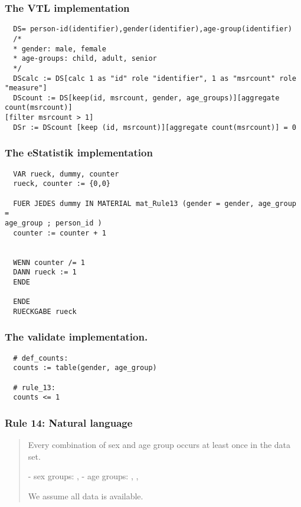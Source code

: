 \subsubsection*{The VTL implementation}
\begin{verbatim}
  DS= person-id(identifier),gender(identifier),age-group(identifier)
  /*
  * gender: male, female
  * age-groups: child, adult, senior
  */
  DScalc := DS[calc 1 as "id" role "identifier", 1 as "msrcount" role "measure"]
  DScount := DS[keep(id, msrcount, gender, age_groups)][aggregate count(msrcount)]
[filter msrcount > 1]
  DSr := DScount [keep (id, msrcount)][aggregate count(msrcount)] = 0
\end{verbatim}
\subsubsection*{The eStatistik implementation}
\begin{verbatim}
  VAR rueck, dummy, counter
  rueck, counter := {0,0}

  FUER JEDES dummy IN MATERIAL mat_Rule13 (gender = gender, age_group =
age_group ; person_id )
  counter := counter + 1


  WENN counter /= 1
  DANN rueck := 1
  ENDE

  ENDE
  RUECKGABE rueck
\end{verbatim}
\subsubsection*{The validate implementation.}
\begin{verbatim}
  # def_counts:
  counts := table(gender, age_group)

  # rule_13:
  counts <= 1
\end{verbatim}


\newpage

\subsubsection*{  Rule 14: Natural language}
\begin{quote}


Every combination of sex and age group occurs at least once in the data set.

- sex groups: , 
- age groups: , ,  

We assume all data is available.


\end{quote}

